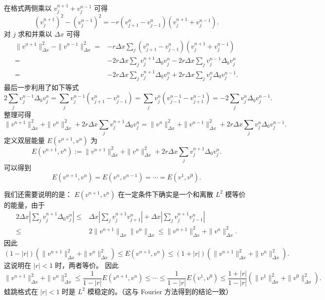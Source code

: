 \begin{solution*}
    在格式两侧乘以 $v_j^{n+1} + v_j^{n-1}$ 可得
    \[
        (v_j^{n+1})^2 - (v_j^{n-1})^2 = - r
        (v_{j+1}^n - v_{j-1}^{n})(v_j^{n+1} + v_j^{n-1}).
    \]
    对 $j$ 求和并乘以 $\Delta x$ 可得
    \begin{align*}
        \|v^{n+1}\|_{\Delta x}^2 - \|v^{n-1}\|_{\Delta x}^2
        ={} & -r \Delta x \sum_j
        (v_{j+1}^n - v_{j-1}^{n})(v_j^{n+1} + v_j^{n-1})     \\
        ={} & - 2 r \Delta x \sum_j v_j^{n+1} \Delta_0 v_j^n
        - 2 r \Delta x \sum_j v_j^{n-1} \Delta_0 v_j^n       \\
        ={} &
        - 2 r \Delta x \sum_j v_j^{n+1} \Delta_0 v_j^n
        + 2 r \Delta x \sum_j v_j^n \Delta_0 v_j^{n-1}.
    \end{align*}
    最后一步利用了如下等式
    \[
        2 \sum_j v_j^{n-1} \Delta_0 v_j^n
        = \sum_j v_j^{n-1} (v_{j+1}^n - v_{j-1}^n)
        = \sum_j v_j^n(v_{j-1}^{n-1}-v_{j+1}^{n-1})
        = -2 \sum_j v_j^n \Delta_0 v_j^{n-1}.
    \]
    整理可得
    \[
        \|v^{n+1}\|_{\Delta x}^2 +\|v^{n}\|_{\Delta x}^2 + 2 r \Delta x \sum_j v_j^{n+1} \Delta_0 v_j^n
        =
        \|v^{n}\|_{\Delta x}^2 +\|v^{n-1}\|_{\Delta x}^2 + 2 r \Delta x \sum_j v_j^{n} \Delta_0 v_j^{n-1}.
    \]
    定义双层能量 $E(v^{n+1},v^{n})$ 为
    \[
        E(v^{n+1},v^{n}) := \|v^{n+1}\|_{\Delta x}^2 +\|v^{n}\|_{\Delta x}^2 + 2 r \Delta x \sum_j v_j^{n+1} \Delta_0 v_j^n.
    \]
    可以得到
    \[
        E(v^{n+1},v^{n}) = E(v^{n},v^{n-1}) = \cdots = E(v^1,v^0).
    \]

    我们还需要说明的是： $E(v^{n+1},v^{n})$ 在一定条件下确实是一个和离散 $L^2$ 模等价的能量，由于
    \begin{align*}
        2 \Delta x \left|\sum_j v_j^{n+1} \Delta_0 v_j^n\right|
        \le{} &
        \Delta x\left|\sum_j v_j^{n+1} v_{j+1}^n \right|
        + \Delta x\left|\sum_j v_j^{n+1} v_{j-1}^n \right|
        \\
        \le{} & 2 \|v^{n+1}\|_{\Delta x} \|v^{n}\|_{\Delta x}
        \le \|v^{n+1}\|_{\Delta x}^2 +\|v^{n}\|_{\Delta x}^2.
    \end{align*}
    因此
    \[
        (1-|r|)\left(\|v^{n+1}\|_{\Delta x}^2 +\|v^{n}\|_{\Delta x}^2\right) \le
        E(v^{n+1},v^{n}) \le (1+|r|)\left(\|v^{n+1}\|_{\Delta x}^2 +\|v^{n}\|_{\Delta x}^2\right).
    \]
    这说明在 $|r| < 1$ 时，两者等价。
    因此
    \[
        \|v^{n+1}\|_{\Delta x}^2 +\|v^{n}\|_{\Delta x}^2
        \le \frac{1}{1-|r|} E(v^{n+1},v^n) \le \cdots \le \frac{1}{1-|r|} E(v^{1},v^0)
        \le \frac{1+|r|}{1-|r|}\left(\|v^{1}\|_{\Delta x}^2 +\|v^{0}\|_{\Delta x}^2\right).
    \]
    蛙跳格式在 $|r| < 1$ 时是 $L^2$ 模稳定的。（这与 Fourier 方法得到的结论一致）
\end{solution*}

